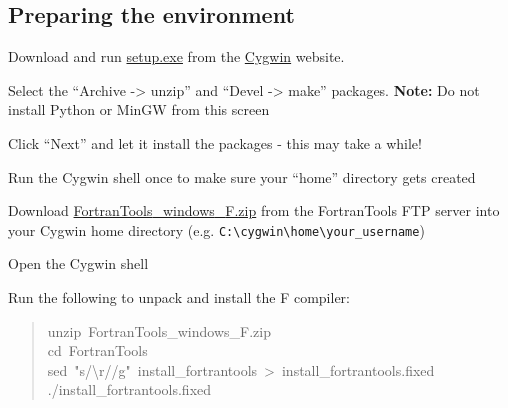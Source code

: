 \documentclass[10pt,a4paper,english]{article}
\begin{document}
\subsection*{Preparing the environment}
\begin{list}{.}
{
\setlength{\rightmargin}{\leftmargin}
}
\item {} 
Download and run \href{http://www.cygwin.com/setup.exe}{setup.exe} from the \href{http://www.cygwin.com/}{Cygwin} website.

\item {} 
Select the ``Archive -{\textgreater} unzip'' and ``Devel -{\textgreater} make'' packages.  \textbf{Note:} Do not install Python or
MinGW from this screen

\item {} 
Click ``Next'' and let it install the packages - this may take a while!

\item {} 
Run the Cygwin shell once to make sure your ``home'' directory gets created

\item {} 
Download \href{ftp://ftp.swcp.com/pub/walt/F/FortranTools_windows_F.zip}{FortranTools{\_}windows{\_}F.zip} from the FortranTools FTP server into your Cygwin home
directory (e.g. \texttt{C:{\textbackslash}cygwin{\textbackslash}home{\textbackslash}your{\_}username})

\item {} 
Open the Cygwin shell

\item {} 
Run the following to unpack and install the F compiler:
\begin{quote}{\ttfamily \raggedright \noindent
unzip~FortranTools{\_}windows{\_}F.zip~\\
cd~FortranTools~\\
sed~"s/{\textbackslash}r//g"~install{\_}fortrantools~>~install{\_}fortrantools.fixed~\\
./install{\_}fortrantools.fixed
}\end{quote}

\end{list}



\hypertarget{building-the-model}{}
\end{document}
